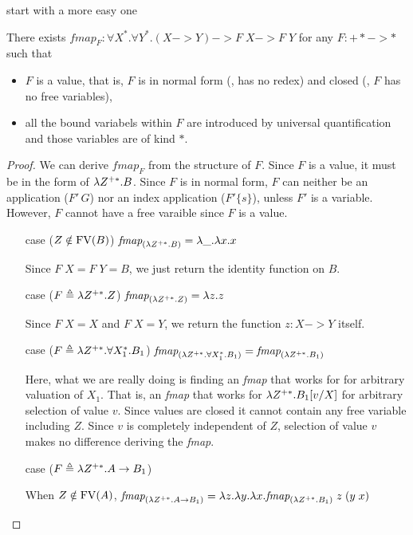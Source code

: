 start with a more easy one
\begin{proposition}
There exists
$\textit{fmap}_F : \forall X^{*}.\forall Y^{*}.(X -> Y) -> F\;X -> F\;Y$
for any $F : +* -> *$ such that
\begin{itemize}
	\item $F$ is a value, that is, $F$ is
		in normal form (\ie, has no redex) and
		closed (\ie, $F$ has no free variables),
	\item all the bound variabels within $F$ are
		introduced by universal quantification
		and those variables are of kind $*$.
\end{itemize}
\end{proposition}
\begin{proof}
	We can derive $\textit{fmap}_F$ from the structure of $F$.
	Since $F$ is a value, it must be in the form of $\lambda Z^{+*}.B$.
	Since $F$ is in normal form, $F$ can neither be
	an application ($F'\,G$) nor an index application ($F'\{s\}$),
	unless $F'$ is a variable. However, $F$ cannot have a free varaible
	since $F$ is a value.
\begin{itemize}
\item[case]($Z\notin \mathop{\mathrm{FV}}(B)$)
	$ \textit{fmap}_{(\lambda Z^{+*}. B)} = \lambda \_ . \lambda x. x $

	Since $F\;X = F\;Y = B$, we just return the identity function on $B$.

\item[case]($F \triangleq \lambda Z^{+*}. Z$)
	$ \textit{fmap}_{(\lambda Z^{+*}. Z)} = \lambda z . z $

	Since $F\;X = X$ and $F\;X = Y$,
	we return the function $z:X -> Y$ itself.

\item[case]($F \triangleq \lambda Z^{+*}. \forall X_1^{*} .B_1$)
	$\textit{fmap}_{(\lambda Z^{+*}. \forall X_1^{*} .B_1)}
	= \textit{fmap}_{(\lambda Z^{+*}.B_1)}$

	Here, what we are really doing is finding an \textit{fmap}
	that works for for arbitrary valuation of $X_1$.
	That is, an \textit{fmap} that works for $\lambda Z^{+*}. B_1[v/X]$
	for arbitrary selection of value $v$. Since values are closed
	it cannot contain any free variable including $Z$. Since $v$
	is completely independent of $Z$, selection of value $v$ makes
	no difference deriving the \textit{fmap}.

\item[case]($F \triangleq \lambda Z^{+*}. A -> B_1$)

	When $Z\notin\mathop{\mathrm{FV}}(A)$,
	$\textit{fmap}_{(\lambda Z^{+*}.A -> B_1)}
	= \lambda z.\lambda y. \lambda x. \textit{fmap}_{(\lambda Z^{+*}.B_1)} \; z \; (y \; x)$


\end{itemize}
\end{proof}
